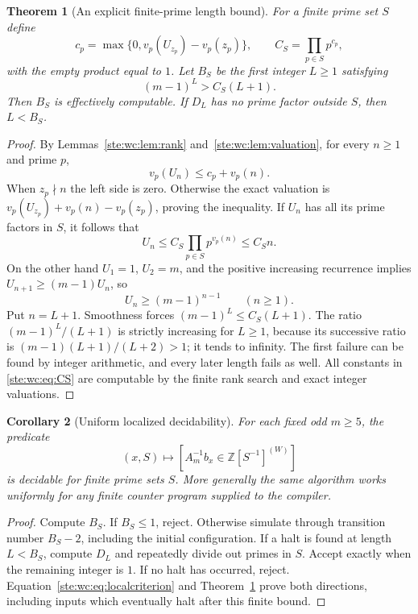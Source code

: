 \documentclass[11pt,letterpaper]{article}
\newtheorem{theorem}{Theorem}[section]
\newtheorem{corollary}[theorem]{Corollary}
\theoremstyle{definition}
\theoremstyle{remark}
\newcommand{\Z}{\mathbb Z}
\begin{document}
\begin{theorem}[An explicit finite-prime length bound]\label{ste:wc:thm:Sbound}
For a finite prime set $S$ define
\begin{equation}\label{ste:wc:eq:CS}
 c_p=\max\{0,v_p(U_{z_p})-v_p(z_p)\},\qquad
 C_S=\prod_{p\in S}p^{c_p},
\end{equation}
with the empty product equal to $1$. Let $B_S$ be the first integer
$L\geq1$ satisfying
\begin{equation}\label{ste:wc:eq:BS}
 (m-1)^L>C_S(L+1).
\end{equation}
Then $B_S$ is effectively computable. If $D_L$ has no prime factor outside
$S$, then $L<B_S$.
\end{theorem}
\begin{proof}
By Lemmas~\ref{ste:wc:lem:rank} and~\ref{ste:wc:lem:valuation}, for every $n\geq1$ and prime $p$,
\begin{equation}\label{ste:wc:eq:majorant}
 v_p(U_n)\leq c_p+v_p(n).
\end{equation}
When $z_p\nmid n$ the left side is zero. Otherwise the exact valuation is
$v_p(U_{z_p})+v_p(n)-v_p(z_p)$, proving the inequality.
If $U_n$ has all its prime factors in $S$, it follows that
\begin{equation}\label{ste:wc:eq:smoothmajorant}
 U_n\leq C_S\prod_{p\in S}p^{v_p(n)}\leq C_S n.
\end{equation}
On the other hand $U_1=1$, $U_2=m$, and the positive increasing recurrence
implies $U_{n+1}\geq(m-1)U_n$, so
\begin{equation}\label{ste:wc:eq:expgrowth}
 U_n\geq(m-1)^{n-1}\qquad(n\geq1).
\end{equation}
Put $n=L+1$. Smoothness forces $(m-1)^L\leq C_S(L+1)$.
The ratio $(m-1)^L/(L+1)$ is strictly increasing for $L\geq1$, because
its successive ratio is $(m-1)(L+1)/(L+2)>1$; it tends to infinity.
The first failure can be found by integer arithmetic, and every later
length fails as well. All constants in \eqref{ste:wc:eq:CS} are computable by the
finite rank search and exact integer valuations.
\end{proof}

\begin{corollary}[Uniform localized decidability]\label{ste:wc:cor:localdecide}
For each fixed odd $m\geq5$, the predicate
\[
 (x,S)\longmapsto [A_m^{-1}b_x\in\Z[S^{-1}]^{(W)}]
\]
is decidable for finite prime sets $S$. More generally the same algorithm
works uniformly for any finite counter program supplied to the compiler.
\end{corollary}
\begin{proof}
Compute $B_S$. If $B_S\leq1$, reject. Otherwise simulate through transition
number $B_S-2$, including the initial configuration. If a halt is found
at length $L<B_S$, compute $D_L$ and repeatedly divide out primes in $S$.
Accept exactly when the remaining integer is $1$. If no halt has occurred,
reject. Equation~\eqref{ste:wc:eq:localcriterion} and Theorem~\ref{ste:wc:thm:Sbound} prove both
directions, including inputs which eventually halt after this finite bound.
\end{proof}
\end{document}
